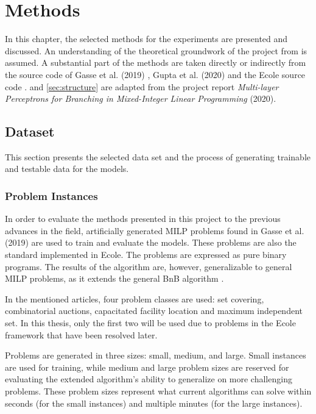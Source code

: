 \chapter{Methods}\label{cha:methods}

In this chapter, the selected methods for the experiments are presented and discussed.  
An understanding of the theoretical groundwork of the project from  is assumed. A substantial part of the methods are taken directly or indirectly from the source code of Gasse et al. (2019) \cite{gasse2019exact}, Gupta et al. (2020) \cite{gupta2020hybrid} and the \gls{Ecole} source code \cite{prouvost2020ecole}.  and \ref{sec:structure} are adapted from the project report \textit{Multi-layer Perceptrons for Branching in Mixed-Integer Linear Programming} (2020). 


\section{Dataset}\label{sec:dataset}

This section presents the selected data set and the process of generating trainable and testable data for the models. 


\subsection{Problem Instances}\label{ssec:probleminstances}

In order to evaluate the methods presented in this project to the previous advances in the field, artificially generated \gls{MILP} problems found in Gasse et al. (2019) \cite{gasse2019exact} are used to train and evaluate the models. These problems are also the standard implemented in \gls{Ecole}.
The problems are expressed as pure binary programs. The results of the algorithm are, however, generalizable to general \gls{MILP} problems, as it extends the general \gls{BnB} algorithm \cite{gasse2019exact}. 

In the mentioned articles, four problem classes are used: set covering, combinatorial auctions, capacitated facility location and maximum independent set. In this thesis, only the first two will be used due to problems in the \gls{Ecole} framework that have been resolved later. 

Problems are generated in three sizes: small, medium, and large. Small instances are used for training, while medium and large problem sizes are reserved for evaluating the extended algorithm's ability to generalize on more challenging problems. These problem sizes represent what current algorithms can solve within seconds (for the small instances) and multiple minutes (for the large instances).


